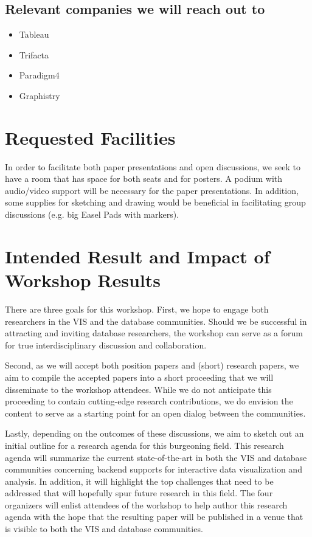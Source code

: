 \documentclass[journal]{vgtc}                %
\begin{document}
\subsection*{Relevant companies we will reach out to}
\begin{itemize}[topsep=0pt, partopsep=0pt, itemsep=-3pt]
\item Tableau
\item Trifacta
\item Paradigm4
\item Graphistry
\end{itemize}


\section{Requested Facilities}

In order to facilitate both paper presentations and open discussions, we seek to have a room that has space for both seats and for posters.
A podium with audio/video support will be necessary for the paper presentations.
In addition, some supplies for sketching and drawing would be beneficial in facilitating group discussions (e.g. big Easel Pads with markers).

\section{Intended Result and Impact of Workshop Results}

There are three goals for this workshop. 
First, we hope to engage both researchers in the VIS and the database communities.
Should we be successful in attracting and inviting database researchers, the workshop can serve as a forum for true interdisciplinary discussion and collaboration.

Second, as we will accept both position papers and (short) research papers, we aim to compile the accepted papers into a short proceeding that we will disseminate to the workshop attendees. 
While we do not anticipate this proceeding to contain cutting-edge research contributions, we do envision the content to serve as a starting point for an open dialog between the communities.

Lastly, depending on the outcomes of these discussions, we aim to sketch out an initial outline for a research agenda for this burgeoning field.
This research agenda will summarize the current state-of-the-art in both the VIS and database communities concerning backend supports for interactive data visualization and analysis.
In addition, it will highlight the top challenges that need to be addressed that will hopefully spur future research in this field.
The four organizers will enlist attendees of the workshop to help author this research agenda with the hope that the resulting paper will be published in a venue that is visible to both the VIS and database communities.
\end{document}
